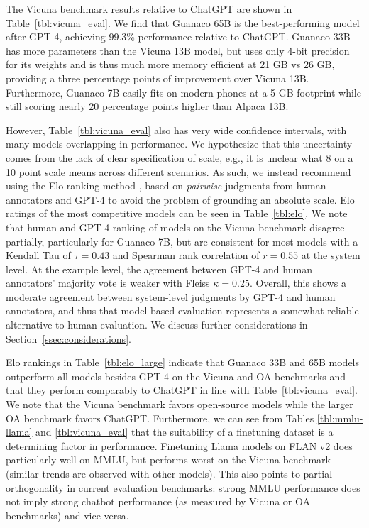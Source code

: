 The Vicuna benchmark \cite{vicuna2023} results relative to ChatGPT are shown in Table~\ref{tbl:vicuna_eval}. We find that {Guanaco} 65B is the best-performing model after GPT-4, achieving 99.3\% performance relative to ChatGPT. {Guanaco} 33B has more parameters than the Vicuna 13B model, but uses only 4-bit precision for its weights and is thus much more memory efficient at 21 GB vs 26 GB, providing a three percentage points of improvement over Vicuna 13B. Furthermore, {Guanaco} 7B easily fits on modern phones at a 5 GB footprint while still scoring nearly 20 percentage points higher than Alpaca 13B. 

However, Table~\ref{tbl:vicuna_eval} also has very wide confidence intervals, with many models overlapping in performance. We hypothesize that this uncertainty comes from the lack of clear specification of scale, e.g., it is unclear what 8 on a 10 point scale means across different scenarios. As such, we instead recommend using the Elo ranking method \citep{elo1967proposed}, based on \textit{pairwise} judgments from human annotators and GPT-4 to avoid the problem of grounding an absolute scale. Elo ratings of the most competitive models can be seen in Table~\ref{tbl:elo}. We note that human and GPT-4 ranking of models on the Vicuna benchmark disagree partially, particularly for Guanaco 7B, but are consistent for most models with a Kendall Tau of $\tau=0.43$ and Spearman rank correlation of $r=0.55$ at the system level. At the example level, the agreement between GPT-4 and human annotators' majority vote is weaker with Fleiss $\kappa=0.25$. Overall, this shows a moderate agreement between system-level judgments by GPT-4 and human annotators, and thus that model-based evaluation represents a somewhat reliable alternative to human evaluation. We discuss further considerations in Section~\ref{ssec:considerations}.

Elo rankings in Table~\ref{tbl:elo_large} indicate that {Guanaco} 33B and 65B models outperform all models besides GPT-4 on the Vicuna and OA benchmarks and that they perform comparably to ChatGPT in line with Table~\ref{tbl:vicuna_eval}. We note that the Vicuna benchmark favors open-source models while the larger OA benchmark favors ChatGPT. Furthermore, we can see from Tables \ref{tbl:mmlu-llama} and \ref{tbl:vicuna_eval} that the suitability of a finetuning dataset is a determining factor in performance. Finetuning Llama models on FLAN v2 does particularly well on MMLU, but performs worst on the Vicuna benchmark (similar trends are observed with other models). This also points to partial orthogonality in current evaluation benchmarks: strong MMLU performance does not imply strong chatbot performance (as measured by Vicuna or OA benchmarks) and vice versa.

